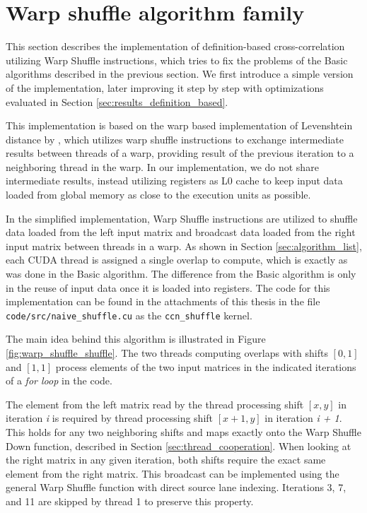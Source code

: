 \section{Warp shuffle algorithm family}
\label{sec:warp_shuffle_alg}

This section describes the implementation of definition-based cross-correlation utilizing Warp Shuffle instructions, which tries to fix the problems of the Basic algorithms described in the previous section. We first introduce a simple version of the implementation, later improving it step by step with optimizations evaluated in Section \ref{sec:results_definition_based}.

This implementation is based on the warp based implementation of Levenshtein distance by \citep{paper:levenstein}, which utilizes warp shuffle instructions to exchange intermediate results between threads of a warp, providing result of the previous iteration to a neighboring thread in the warp. In our implementation, we do not share intermediate results, instead utilizing registers as L0 cache to keep input data loaded from global memory as close to the execution units as possible. 


In the simplified implementation, Warp Shuffle instructions are utilized to shuffle data loaded from the left input matrix and broadcast data loaded from the right input matrix between threads in a warp. As shown in Section \ref{sec:algorithm_list}, each CUDA thread is assigned a single overlap to compute, which is exactly as was done in the Basic algorithm. The difference from the Basic algorithm is only in the reuse of input data once it is loaded into registers. The code for this implementation can be found in the attachments of this thesis in the file \texttt{code/src/naive\_shuffle.cu} as the \texttt{ccn\_shuffle} kernel.

The main idea behind this algorithm is illustrated in Figure \ref{fig:warp_shuffle_shuffle}. The two threads computing overlaps with shifts $[0,1]$ and $[1,1]$ process elements of the two input matrices in the indicated iterations of a \textit{for loop} in the code.


The element from the left matrix read by the thread processing shift $[x, y]$ in iteration \textit{i} is required by thread processing shift $[x + 1,y]$ in iteration \textit{i + 1}. This holds for any two neighboring shifts and maps exactly onto the Warp Shuffle Down function, described in Section \ref{sec:thread_cooperation}. When looking at the right matrix in any given iteration, both shifts require the exact same element from the right matrix. This broadcast can be implemented using the general Warp Shuffle function with direct source lane indexing. Iterations 3, 7, and 11 are skipped by thread 1 to preserve this property.


